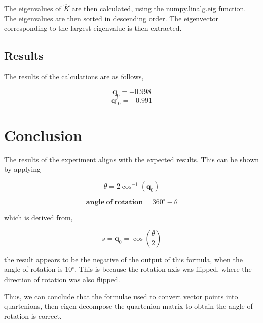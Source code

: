 \documentclass{article}
\begin{document}
The eigenvalues of $\hat{K}$ are then calculated, using the numpy.linalg.eig function. The eigenvalues are then sorted in descending order. The eigenvector corresponding to the largest eigenvalue is then extracted.

\subsection{Results}

The results of the calculations are as follows,

$$\mathbf{q}_{0} = -0.998$$ 
$$\mathbf{q'}_{0} = -0.991$$ 

\section{Conclusion}
The results of the experiment aligns with the expected results. This can be shown by applying

$$
\theta = 2\cos^{-1}(\mathbf{q}_{0})
$$

$$
\mathbf{angle\ of\ rotation} = 360^{\circ} - \theta
$$

which is derived from,

$$
s = \mathbf{q}_{0} = \cos(\frac{\theta}{2})
$$

the result appears to be the negative of the output of this formula, when the angle of rotation is 10$^{\circ}$. This is because the rotation axis was flipped, where the direction of rotation was also flipped.

Thus, we can conclude that the formulae used to convert vector points into quartenions, then eigen decompose the quartenion matrix to obtain the angle of rotation is correct.
\end{document}
